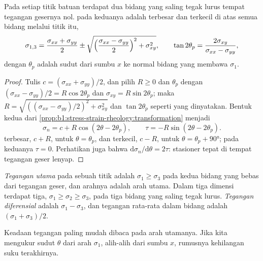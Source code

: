 \begin{theorem}\label{thm:b1:stress-strain-rheology:principal}
Pada setiap titik batuan terdapat dua bidang yang saling tegak lurus tempat tegangan gesernya nol.  pada keduanya adalah  terbesar dan terkecil di atas semua bidang melalui titik itu,
\[
  \sigma_{1,3} = \frac{\sigma_{xx}+\sigma_{yy}}{2} \pm
  \sqrt{\Bigl(\frac{\sigma_{xx}-\sigma_{yy}}{2}\Bigr)^2 + \sigma_{xy}^2},
  \qquad \tan2\theta_p = \frac{2\sigma_{xy}}{\sigma_{xx}-\sigma_{yy}},
\]
dengan $\theta_p$ adalah sudut dari sumbu $x$ ke normal bidang yang membawa $\sigma_1$.
\end{theorem}

\begin{proof}
Tulis $c = (\sigma_{xx}+\sigma_{yy})/2$, dan pilih $R \ge 0$ dan $\theta_p$
dengan $(\sigma_{xx}-\sigma_{yy})/2 = R\cos2\theta_p$ dan
$\sigma_{xy} = R\sin2\theta_p$; maka
$R = \sqrt{((\sigma_{xx}-\sigma_{yy})/2)^2 + \sigma_{xy}^2}$ dan
$\tan2\theta_p$ seperti yang dinyatakan. Bentuk kedua dari
\cref{prop:b1:stress-strain-rheology:transformation} menjadi
\[
  \sigma_n = c + R\cos(2\theta - 2\theta_p), \qquad \tau = -R\sin(2\theta - 2\theta_p).
\]
 terbesar, $c + R$, untuk $\theta = \theta_p$, dan terkecil,
$c - R$, untuk $\theta = \theta_p + \ang{90}$; pada keduanya $\tau = 0$. Perhatikan juga
bahwa $\mathrm d\sigma_n/\mathrm d\theta = 2\tau$:  stasioner tepat di tempat
tegangan geser lenyap.
\end{proof}

\begin{definition}\label{def:b1:stress-strain-rheology:principal}
\emph{Tegangan utama} pada sebuah titik adalah 
$\sigma_1 \ge \sigma_3$ pada kedua bidang yang bebas dari tegangan geser, dan arahnya adalah
arah utama. Dalam tiga dimensi terdapat tiga, $\sigma_1 \ge \sigma_2 \ge \sigma_3$, pada tiga
bidang yang saling tegak lurus. \emph{Tegangan diferensial} adalah $\sigma_1 - \sigma_3$, dan tegangan rata-rata dalam bidang adalah
$(\sigma_1+\sigma_3)/2$.
\end{definition}

Keadaan tegangan paling mudah dibaca pada arah utamanya. Jika kita mengukur sudut $\theta$
dari arah $\sigma_1$, alih-alih dari sumbu $x$, rumusnya kehilangan suku terakhirnya.

